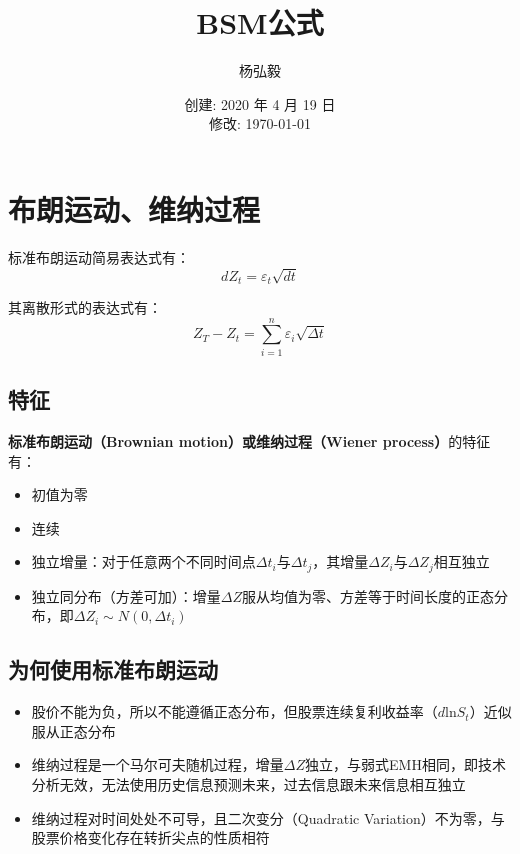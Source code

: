 \documentclass[11pt]{article}
\title{BSM公式}
\author{杨弘毅}
\date{创建: 2020 年 4 月 19 日 \\修改: \today}
\begin{document}
\maketitle

\section{布朗运动、维纳过程}

标准布朗运动简易表达式有：
\begin{equation*}
    dZ_t = \varepsilon_t \sqrt{dt}
\end{equation*}

其离散形式的表达式有：
\begin{equation*}
    Z_T - Z_t = \sum^n_{i=1} \varepsilon_i \sqrt{\Delta t}
\end{equation*}

\subsection{特征}
\textbf{标准布朗运动（Brownian motion）或维纳过程（Wiener process）}的特征有：
\begin{itemize}
    \item 初值为零
    \item 连续
    \item 独立增量：对于任意两个不同时间点$\Delta t_i$与$\Delta t_j$，其增量$\Delta Z_i$与$\Delta Z_j$相互独立
    \item 独立同分布（方差可加）：增量$\Delta Z$服从均值为零、方差等于时间长度的正态分布，即$\Delta Z_i  \sim N(0,\Delta t_i)$
\end{itemize}

\subsection{为何使用标准布朗运动}

\begin{itemize}
    \item 股价不能为负，所以不能遵循正态分布，但股票连续复利收益率（$d\text{ln} S_t$）近似服从正态分布
    \item 维纳过程是一个马尔可夫随机过程，增量$\Delta Z$独立，与弱式EMH相同，即技术分析无效，无法使用历史信息预测未来，过去信息跟未来信息相互独立
    \item 维纳过程对时间处处不可导，且二次变分（Quadratic Variation）不为零，与股票价格变化存在转折尖点的性质相符
\end{itemize}
\end{document}
